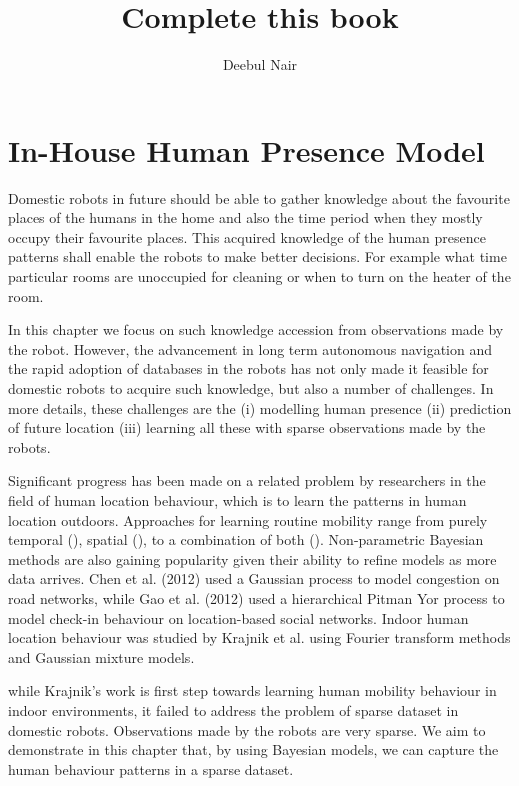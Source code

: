 \documentclass[11pt]{book}
\title{\textbf{Complete this book }}
\author{Deebul Nair}
\date{}
\begin{document}
\chapter{In-House Human Presence Model}

Domestic robots in future should be able to gather knowledge about the favourite places of the humans in the home and also the time period when they mostly occupy their favourite places. This acquired knowledge of the human presence patterns shall enable the robots to make better decisions. For example what time particular rooms are unoccupied for cleaning or when to turn on the heater of the room. 

In this chapter we focus on such knowledge accession from observations made by the robot. However, the advancement in long term autonomous navigation  and the rapid adoption of databases in the robots  has not only made it feasible for domestic robots to acquire such knowledge, but also a number of challenges.  In more details, these challenges are the (i) modelling human presence (ii) prediction of future location (iii) learning all these with sparse observations made by the robots. 

Significant progress has been made on a related problem by researchers in the field of human location behaviour, which is to learn the patterns in human location outdoors. Approaches for learning routine mobility  range from purely temporal (\cite{c1, c2}), spatial (\cite{c5,c3}), to a combination  of  both  (\cite{c4}). Non-parametric Bayesian methods are also gaining popularity given their ability to refine models as more data arrives. Chen et al. (2012) used a Gaussian process to model congestion on road networks, while Gao et al. (2012) used a hierarchical Pitman Yor process to model check-in behaviour on location-based social networks. Indoor human location behaviour was studied by Krajnik et al.  using Fourier transform methods and Gaussian mixture models. 

while Krajnik's  work is first step towards learning human mobility behaviour in indoor environments, it failed to address the problem of sparse dataset in domestic robots. Observations made by the robots are very sparse. We aim to demonstrate in this chapter that, by using Bayesian models, we can capture the human behaviour patterns in a sparse dataset.
\end{document}
